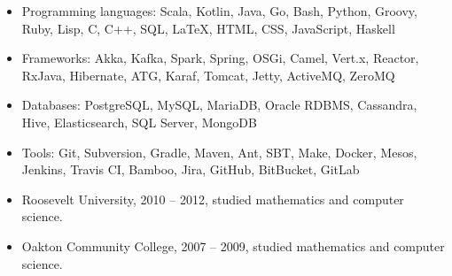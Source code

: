 \documentclass{harnon-cv}
\begin{document}
\stoptimeline

\begin{itemize}
    \item Programming languages: Scala, Kotlin, Java, Go, Bash, Python, Groovy, Ruby, Lisp, C, C++, SQL, \LaTeX, HTML, CSS, JavaScript, Haskell
    \item Frameworks: Akka, Kafka, Spark, Spring, OSGi, Camel, Vert.x, Reactor, RxJava, Hibernate, ATG, Karaf, Tomcat, Jetty, ActiveMQ, ZeroMQ
    \item Databases: PostgreSQL, MySQL, MariaDB, Oracle RDBMS, Cassandra, Hive, Elasticsearch, SQL Server, MongoDB
    \item Tools: Git, Subversion, Gradle, Maven, Ant, SBT, Make, Docker, Mesos, Jenkins, Travis CI, Bamboo, Jira, GitHub, BitBucket, GitLab
\end{itemize}


\begin{itemize}
    \item Roosevelt University, 2010 -- 2012, studied mathematics and computer science.
    \item Oakton Community College, 2007 -- 2009, studied mathematics and computer science.
\end{itemize}
\end{document}
